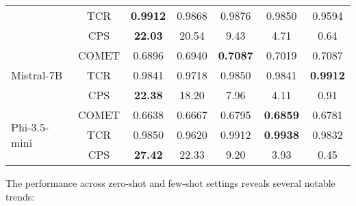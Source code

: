 \documentclass[conference]{IEEEtran}
\begin{document}
\begin{table*}[htbp]
{\begin{tabular}{|l|c|c|c|c|c|c|}
 & TCR & \textbf{0.9912} & 0.9868 & 0.9876 & 0.9850 & 0.9594 \\
 & CPS & \textbf{22.03} & 20.54 & 9.43 & 4.71 & 0.64 \\
\hline
\multirow{3}{*}{Mistral-7B} & COMET & 0.6896 & 0.6940 & \textbf{0.7087} & 0.7019 & 0.7087 \\
 & TCR & 0.9841 & 0.9718 & 0.9850 & 0.9841 & \textbf{0.9912} \\
 & CPS & \textbf{22.38} & 18.20 & 7.96 & 4.11 & 0.91 \\
\hline
\multirow{3}{*}{Phi-3.5-mini} & COMET & 0.6638 & 0.6667 & 0.6795 & \textbf{0.6859} & 0.6781 \\
 & TCR & 0.9850 & 0.9620 & 0.9912 & \textbf{0.9938} & 0.9832 \\
 & CPS & \textbf{27.42} & 22.33 & 9.20 & 3.93 & 0.45 \\
\hline
\end{tabular}%
}
\end{table*}

The performance across zero-shot and few-shot settings reveals several notable trends: 
\end{document}
